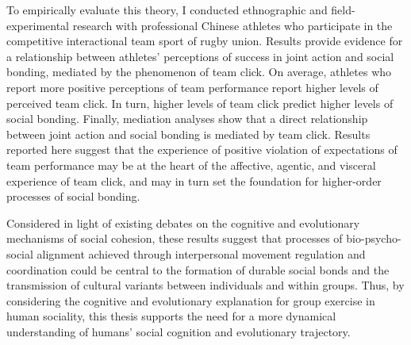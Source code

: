 To empirically evaluate this theory, I conducted ethnographic and field-experimental research with professional Chinese athletes who participate in the competitive interactional team sport of rugby union.  Results provide evidence for a relationship between athletes' perceptions of success in joint action and social bonding, mediated by the phenomenon of team click.  On average, athletes who report more positive perceptions of team performance report higher levels of perceived team click.  In turn, higher levels of team click predict higher levels of social bonding.  Finally, mediation analyses show that a direct relationship between joint action and social bonding is mediated by team click.  Results reported here suggest that the experience of positive violation of expectations of team performance may be at the heart of the affective, agentic, and visceral experience of team click, and may in turn set the foundation for higher-order processes of social bonding.

Considered in light of existing debates on the cognitive and evolutionary mechanisms of social cohesion, these results suggest that processes of bio-psycho-social alignment achieved through interpersonal movement regulation and coordination could be central to the formation of durable social bonds and the transmission of cultural variants between individuals and within groups.  Thus, by considering the cognitive and evolutionary explanation for group exercise in human sociality, this thesis supports the need for a more dynamical understanding of humans' social cognition and evolutionary trajectory.
